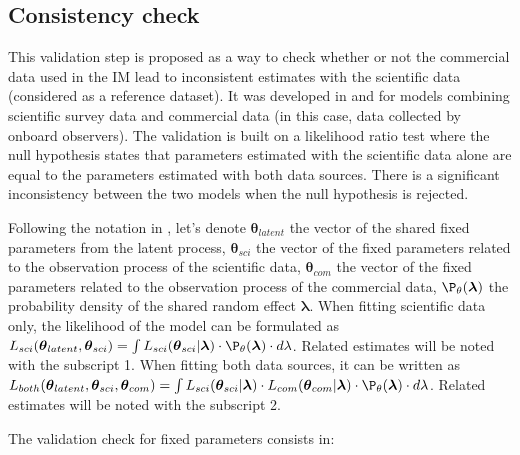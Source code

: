 \clearpage

\subsection{Consistency check}\label{appendix:Consistency}

This validation step is proposed as a way to check whether or not the commercial data used in the IM lead to inconsistent estimates with the scientific data (considered as a reference dataset). It was developed in \textcite{rufener-integrating-2020} and \textcite{rufener-bridging-2021} for models combining scientific survey data and commercial data (in this case, data collected by onboard observers). The validation is built on a likelihood ratio test where the null hypothesis states that parameters estimated with the scientific data alone are equal to the parameters estimated with both data sources. There is a significant inconsistency between the two models when the null hypothesis is rejected.

Following the notation in \textcite{rufener-integrating-2020}, let’s denote $\boldsymbol{\theta}_{latent}$ the vector of the shared fixed parameters from the latent process, $\boldsymbol{\theta}_{sci}$ the vector of the fixed parameters related to the observation process of the scientific data, $\boldsymbol{\theta}_{com}$ the vector of the fixed parameters related to the observation process of the commercial data, $\P_\theta (\boldsymbol{\lambda})$ the probability density of the shared random effect $\boldsymbol{\lambda}$. When fitting scientific data only, the likelihood of the model can be formulated as \(L_{sci} (\boldsymbol{\theta}_{latent},\boldsymbol{\theta}_{sci} )=\int L_{sci} (\boldsymbol{\theta}_{sci}|\boldsymbol{\lambda}) \cdot \P_\theta (\boldsymbol{\lambda}) \cdot d\lambda\). Related estimates will be noted with the subscript 1. When fitting both data sources, it can be written as \(L_{both} (\boldsymbol{\theta}_{latent},\boldsymbol{\theta}_{sci},\boldsymbol{\theta}_{com} )= \int L_{sci} (\boldsymbol{\theta}_{sci}|\boldsymbol{\lambda}) \cdot L_{com} (\boldsymbol{\theta}_{com}|\boldsymbol{\lambda}) \cdot \P_\theta (\boldsymbol{\lambda}) \cdot d\lambda\). Related estimates will be noted with the subscript 2.

The validation check for fixed parameters consists in:

